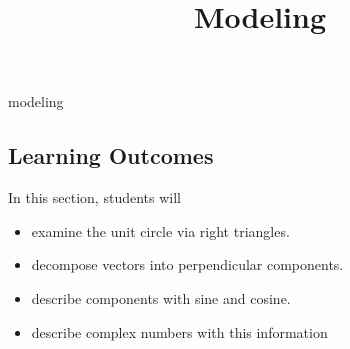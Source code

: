 \documentclass{ximera}
\title{Modeling}
\begin{document}
\begin{abstract}
\end{abstract}
\maketitle


modeling







\subsection{Learning Outcomes}


\begin{sectionOutcomes}
In this section, students will 

\begin{itemize}
\item examine the unit circle via right triangles.
\item decompose vectors into perpendicular components.
\item describe components with sine and cosine.
\item describe complex numbers with this information
\end{itemize}
\end{sectionOutcomes}
\end{document}
